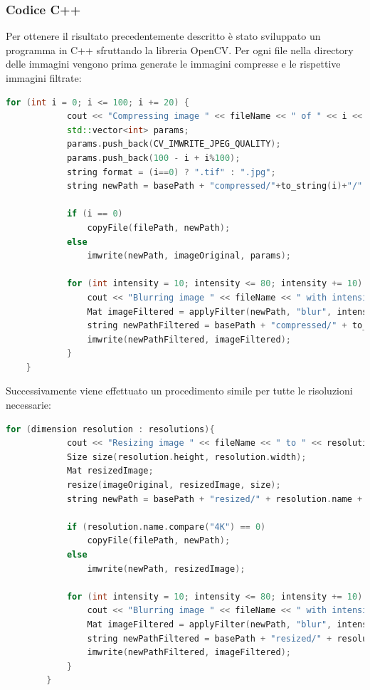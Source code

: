 \documentclass[a4paper,11pt]{article}
\begin{document}
    \subsubsection{Codice C++}
    Per ottenere il risultato precedentemente descritto è stato sviluppato un programma in C++ sfruttando la libreria OpenCV.
    Per ogni file nella directory delle immagini vengono prima generate le immagini compresse e le rispettive immagini filtrate:
    \begin{lstlisting}[language=C++]
    for (int i = 0; i <= 100; i += 20) {
			cout << "Compressing image " << fileName << " of " << i << "%" << endl;
			std::vector<int> params;
			params.push_back(CV_IMWRITE_JPEG_QUALITY);
			params.push_back(100 - i + i%100); 
			string format = (i==0) ? ".tif" : ".jpg";
			string newPath = basePath + "compressed/"+to_string(i)+"/" + fileName + format;

			if (i == 0)
				copyFile(filePath, newPath);
			else
				imwrite(newPath, imageOriginal, params);

			for (int intensity = 10; intensity <= 80; intensity += 10) {
				cout << "Blurring image " << fileName << " with intensity " << intensity << endl;
				Mat imageFiltered = applyFilter(newPath, "blur", intensity);
				string newPathFiltered = basePath + "compressed/" + to_string(i) + "/" + explode(fileName, '_')[0] + "_B" + to_string(intensity/10) + format;
				imwrite(newPathFiltered, imageFiltered);
			}
	}
    \end{lstlisting}
    \newpage
    Successivamente viene effettuato un procedimento simile per tutte le risoluzioni necessarie:
    \begin{lstlisting}[language=C++]
        for (dimension resolution : resolutions){
            cout << "Resizing image " << fileName << " to " << resolution.name << endl;
            Size size(resolution.height, resolution.width);
            Mat resizedImage;
            resize(imageOriginal, resizedImage, size);
            string newPath = basePath + "resized/" + resolution.name + "/" + fileName + ".tif";

            if (resolution.name.compare("4K") == 0) 
                copyFile(filePath, newPath);
            else
                imwrite(newPath, resizedImage);

            for (int intensity = 10; intensity <= 80; intensity += 10) {
                cout << "Blurring image " << fileName << " with intensity " << intensity << endl;
                Mat imageFiltered = applyFilter(newPath, "blur", intensity);
                string newPathFiltered = basePath + "resized/" + resolution.name + "/" + explode(fileName, '_')[0] + "_B" + to_string(intensity / 10) + ".tif";
                imwrite(newPathFiltered, imageFiltered);
            }
        }
    \end{lstlisting} 
\end{document}
